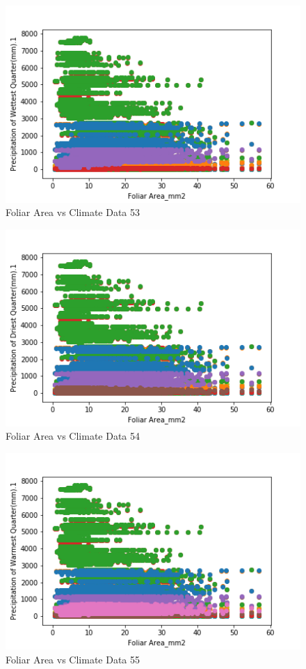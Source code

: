 \documentclass[letterpaper]{article}
\begin{document}
\begin{figure}[h]
\caption{Foliar Area vs Climate Data 53\label{fig:Foliar_Area_vs_53}}
\centering
\includegraphics[width=0.7\paperwidth]{Foliar_Area_vs_53}
\end{figure}


\begin{figure}[h]
\caption{Foliar Area vs Climate Data 54\label{fig:Foliar_Area_vs_54}}
\centering
\includegraphics[width=0.7\paperwidth]{Foliar_Area_vs_54}
\end{figure}


\begin{figure}[h]
\caption{Foliar Area vs Climate Data 55\label{fig:Foliar_Area_vs_55}}
\centering
\includegraphics[width=0.7\paperwidth]{Foliar_Area_vs_55}
\end{figure}
\end{document}
